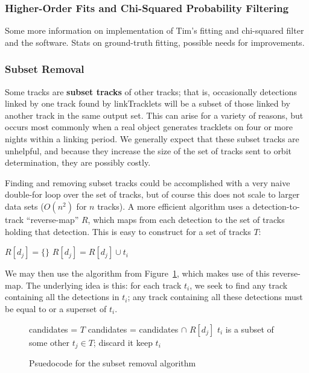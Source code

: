 \subsubsection{Higher-Order Fits and Chi-Squared Probability Filtering}
\label{trackFilters}
Some more information on implementation of Tim's fitting and
chi-squared filter and the software. Stats on ground-truth fitting,
possible needs for improvements.

\subsubsection{Subset Removal}
\label{subsetRemoval}
Some tracks are {\bf subset tracks} of other tracks; that is,
occasionally detections linked by one track found by linkTracklets
will be a subset of those linked by another track in the same output
set.  This can arise for a variety of reasons, but occurs most
commonly when a real object generates tracklets on four or more nights
within a linking period. We generally expect that these subset tracks
are unhelpful, and because they increase the size of the set of tracks
sent to orbit determination, they are possibly costly.

Finding and removing subset tracks could be accomplished with a very
naive double-for loop over the set of tracks, but of course this does
not scale to larger data sets ($O(n^2)$ for $n$ tracks).  A more
efficient algorithm uses a detection-to-track ``reverse-map'' $R$,
which maps from each detection to the set of tracks holding that
detection.  This is easy to construct for a set of tracks $T$:

\begin{algorithmic}
  \STATE $R[d_j] = \{\}$
  \ENDFOR
  \STATE $R[d_j] = R[d_j] \cup t_i$
  \ENDFOR
\end{algorithmic}

We may then use the algorithm from
Figure~\ref{subsetRemovalAlgorithm}, which makes use of this
reverse-map.  The underlying idea is this: for each track $t_i$, we
seek to find any track containing all the detections in $t_i$; any
track containing all these detections must be equal to or a superset
of $t_i$.

\begin{figure}[h!]
\begin{algorithmic}
  \STATE candidates = $T$
    \STATE candidates = candidates $\cap$ $R[d_j]$
  \ENDFOR
    \STATE $t_i$ is a subset of some other $t_j \in T$; discard it
  \ELSE 
    \STATE keep $t_i$
  \ENDIF
\ENDFOR
\end{algorithmic}
\caption{Psuedocode for the subset removal algorithm}

\label{subsetRemovalAlgorithm}
\end{figure}

